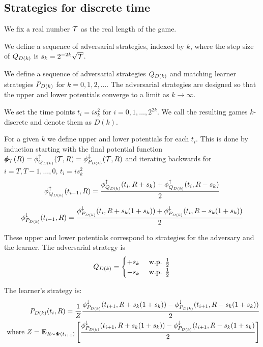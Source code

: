 \documentclass{article}[12pt]
\begin{document}
\subsection{Strategies for discrete time}
\label{sec:disc-game-strategies}

We fix a real number $\mathcal{T}$ as the real length of the game.

We define a sequence of adversarial strategies, indexed by $k$, where the step size of $Q_{D(k)}$ is $s_k = 2^{-2k} \sqrt{\mathcal{T}}$.

We define a sequence of adversarial strategies $Q_{D(k)}$ and
matching learner strategies $P_{D(k)}$ for $k=0,1,2,\ldots$. The
adversarial strategies are designed so that the upper and lower
potentials converge to a limit as $k \to \infty$.

We set the time points $t_i =i s_k^2$ for $i=0,1,\ldots,2^{2k}$. We
call the resulting games $k$-discrete and denote them as $D(k)$.

For a given $k$ we define upper and lower potentials for each
$t_i$. This is done by induction starting with the final potential
function  $\pmb{\phi}_{\mathcal{T}}(R)=\phi_{Q_{D(k)}}^{\uparrow}(\mathcal{T}, R)=\phi_{P_{D(k)}}^{\downarrow}(\mathcal{T}, R)$ and iterating
backwards for  $i=T,T-1,\ldots,0$, $t_i = i s_k^2$ 
 \begin{equation} \label{eqn:backward-iteration-lower-discrete}
   \phi_{Q_{D(k)}}^{\uparrow}(t_{i-1}, R) = \frac{\phi_{Q_{D(k)}}^{\uparrow}(t_i,R+s_k) + \phi_{Q_{D(k)}}^{\uparrow}(t_i,R-s_k)}{2}
 \end{equation}

 \begin{equation} \label{eqn:backward-iteration-upper-recursion-discrete}
   \phi_{P_{D(k)}}^{\downarrow}(t_{i-1}, R) = \frac{\phi_{P_{D(k)}}^{\downarrow}(t_i,R+s_k(1+s_k)) + \phi_{P_{D(k)}}^{\downarrow}(t_i,R-s_k(1+s_k))}{2}
 \end{equation}

These upper and lower potentials correspond to strategies for the
adversary and the learner.
The adversarial strategy is 
\begin{equation} \label{eqn:adv-strat-dk}
  Q_{D(k)}=  \begin{cases}
    +s_k & \mbox{ w.p. } \frac{1}{2}\\
    -s_k & \mbox{ w.p. } \frac{1}{2}\\
  \end{cases}
\end{equation}

The learner's strategy is:
\begin{eqnarray} \label{eqn:learner-strat-1c}
  P_{D(k)}(t_{i},R) = \frac{1}{Z}
  \frac{\phi_{P_{D(k)}}^{\downarrow}(t_{i+1},R+s_k(1+s_k)) -
  \phi_{P_{D(k)}}^{\downarrow}(t_{i+1},R-s_k(1+s_k))}{2} \\
  \mbox{ where } Z = {\bf E}_{R \sim {\bf \Psi}(t_{i+1})}\left[ \frac{\phi_{P_{D(k)}}^{\downarrow}(t_{i+1},R+s_k(1+s_k)) -
  \phi_{P_{D(k)}}^{\downarrow}(t_{i+1},R-s_k(1+s_k)}{2} \right] \nonumber
\end{eqnarray}
\end{document}
